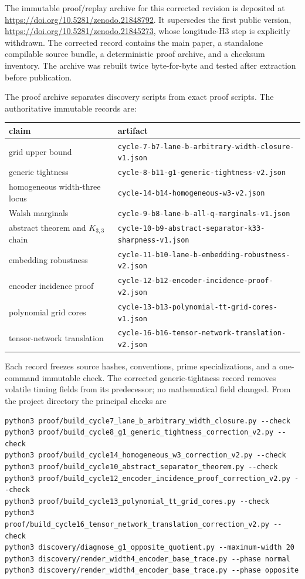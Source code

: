 \documentclass[11pt]{article}
\begin{document}
The immutable proof/replay archive for this corrected revision is deposited
at \url{https://doi.org/10.5281/zenodo.21848792}.  It supersedes the first
public version, \url{https://doi.org/10.5281/zenodo.21845273}, whose
longitude-H3 step is explicitly withdrawn.  The corrected record contains the main
paper, a standalone compilable source bundle, a deterministic proof archive,
and a checksum inventory.  The archive was rebuilt twice byte-for-byte and
tested after extraction before publication.

The proof archive separates discovery scripts from exact proof scripts.  The
authoritative immutable records are:
\begin{center}
\small
\begin{tabular}{@{}ll@{}}
\toprule
claim & artifact\\
\midrule
grid upper bound & \texttt{cycle-7-b7-lane-b-arbitrary-width-closure-v1.json}\\
generic tightness & \texttt{cycle-8-b11-g1-generic-tightness-v2.json}\\
homogeneous width-three locus &
\texttt{cycle-14-b14-homogeneous-w3-v2.json}\\
Walsh marginals & \texttt{cycle-9-b8-lane-b-all-q-marginals-v1.json}\\
abstract theorem and \(K_{3,3}\) chain &
\texttt{cycle-10-b9-abstract-separator-k33-sharpness-v1.json}\\
embedding robustness &
\texttt{cycle-11-b10-lane-b-embedding-robustness-v2.json}\\
encoder incidence proof &
\texttt{cycle-12-b12-encoder-incidence-proof-v2.json}\\
polynomial grid cores &
\texttt{cycle-13-b13-polynomial-tt-grid-cores-v1.json}\\
tensor-network translation &
\texttt{cycle-16-b16-tensor-network-translation-v2.json}\\
\bottomrule
\end{tabular}
\end{center}
Each record freezes source hashes, conventions, prime specializations, and a
one-command immutable check.  The corrected generic-tightness record removes
volatile timing fields from its predecessor; no mathematical field changed.
From the project directory the principal checks are
\begin{verbatim}
python3 proof/build_cycle7_lane_b_arbitrary_width_closure.py --check
python3 proof/build_cycle8_g1_generic_tightness_correction_v2.py --check
python3 proof/build_cycle14_homogeneous_w3_correction_v2.py --check
python3 proof/build_cycle10_abstract_separator_theorem.py --check
python3 proof/build_cycle12_encoder_incidence_proof_correction_v2.py --check
python3 proof/build_cycle13_polynomial_tt_grid_cores.py --check
python3 proof/build_cycle16_tensor_network_translation_correction_v2.py --check
python3 discovery/diagnose_g1_opposite_quotient.py --maximum-width 20
python3 discovery/render_width4_encoder_base_trace.py --phase normal
python3 discovery/render_width4_encoder_base_trace.py --phase opposite
\end{verbatim}
\end{document}
